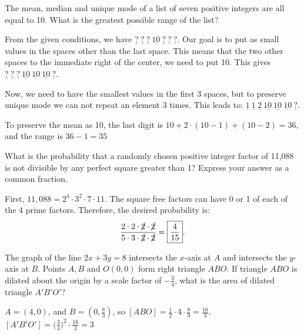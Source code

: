 \documentclass[11pt,twoside]{scrartcl}
\begin{document}
\begin{problem}
    The mean, median and unique mode of a list of seven positive integers are all equal to 10. What is the greatest possible range of the list?
    \begin{sketch}
        From the given conditions, we have $\underline{?}\ \underline{?}\ \underline{?}\ \underline{10}\ \underline{?}\ \underline{?}\ \underline{?}$. Our goal is to put as small values in the spaces other than the last space. This means that the two other spaces to the immediate right of the center, we need to put 10. This gives $\underline{?}\ \underline{?}\ \underline{?}\ \underline{10}\ \underline{10}\ \underline{10}\ \underline{?}$.

        Now, we need to have the smallest values in the first 3 spaces, but to preserve unique mode we can not repeat an element 3 times. This leads to: $\underline{1}\ \underline{1}\ \underline{2}\ \underline{10}\ \underline{10}\ \underline{10}\ \underline{?}$. 

        To preserve the mean as 10, the last digit is $10 + 2\cdot (10-1) + (10-2) = 36$, and the range is $36 - 1 = \boxed{35}$
    \end{sketch}
\end{problem}

\begin{problem}
    What is the probability that a randomly chosen positive integer factor of 11,088 is not divisible by any perfect square greater than 1? Express your answer as a common fraction.
    \begin{sketch}
        First, $11,088 = 2^4\cdot 3^2 \cdot 7 \cdot 11$. The square free factors can have 0 or 1 of each of the 4 prime factors. Therefore, the desired probability is:
        \[\frac{2\cdot2\cdot\cancel{2}\cdot\cancel{2}}{5\cdot3\cdot\cancel{2}\cdot\cancel{2}} = \boxed{\frac{4}{15}}.\]
    \end{sketch}
\end{problem}

\begin{problem}
    The graph of the line $ 2x+3y=8 $ intersects the $ x $-axis at $ A $ and intersects the $ y $-axis at $ B $. Points $ A,B $ and $ O(0,0) $ form right triangle $ ABO $. If triangle $ ABO $ is dilated about the origin by a scale factor of $ -\frac{3}{4} $, what is the area of dilated triangle $ A'B'O' $?
    \begin{sketch}
        $A = (4,0)$, and $B = (0,\frac{8}{3})$, so $[ABO] = \frac{1}{2}\cdot4\cdot\frac{8}{3} = \frac{16}{3}$. $[A'B'O'] = \big(\frac{3}{4}\big)^2 \cdot \frac{16}{3} = \boxed{3}$
    \end{sketch}
\end{problem}
\end{document}
